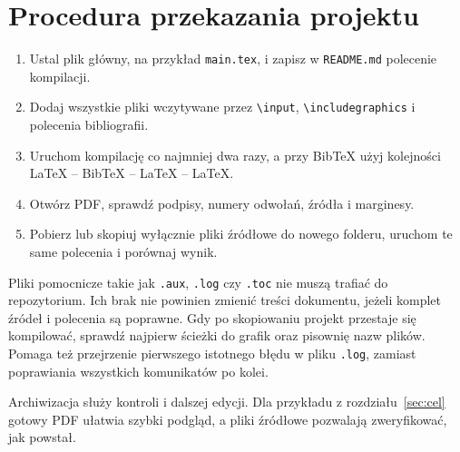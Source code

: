 \section{Procedura przekazania projektu}\label{sec:procedura}
\begin{enumerate}
\item Ustal plik główny, na przykład \texttt{main.tex}, i zapisz w
  \texttt{README.md} polecenie kompilacji.
\item Dodaj wszystkie pliki wczytywane przez \texttt{\textbackslash input},
  \texttt{\textbackslash includegraphics} i polecenia bibliografii.
\item Uruchom kompilację co najmniej dwa razy, a przy BibTeX użyj
  kolejności LaTeX -- BibTeX -- LaTeX -- LaTeX.
\item Otwórz PDF, sprawdź podpisy, numery odwołań, źródła i marginesy.
\item Pobierz lub skopiuj wyłącznie pliki źródłowe do nowego folderu,
  uruchom te same polecenia i porównaj wynik.
\end{enumerate}

Pliki pomocnicze takie jak \texttt{.aux}, \texttt{.log} czy
\texttt{.toc} nie muszą trafiać do repozytorium. Ich brak nie powinien
zmienić treści dokumentu, jeżeli komplet źródeł i polecenia są poprawne.
Gdy po skopiowaniu projekt przestaje się kompilować, sprawdź najpierw
ścieżki do grafik oraz pisownię nazw plików. Pomaga też przejrzenie
pierwszego istotnego błędu w pliku \texttt{.log}, zamiast poprawiania
wszystkich komunikatów po kolei.

Archiwizacja służy kontroli i dalszej edycji. Dla przykładu z
rozdziału~\ref{sec:cel} gotowy PDF ułatwia szybki podgląd, a pliki
źródłowe pozwalają zweryfikować, jak powstał.
